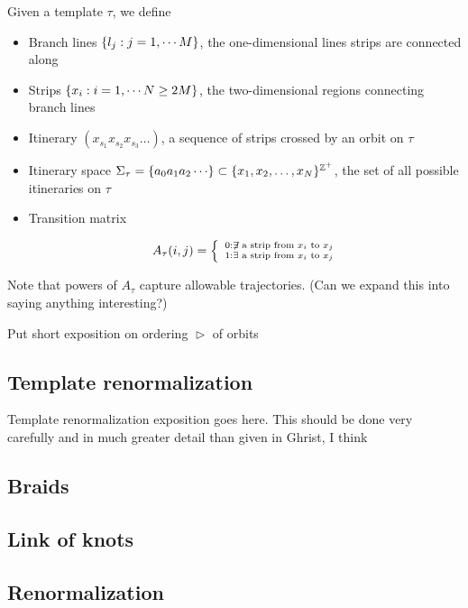 \documentclass[paper.tex]{subfiles}
\begin{document}
\begin{definition}
  Given a template $\tau$, we define
  \begin{itemize}
    \item Branch lines  $\{ l_j : j = 1, \cdots M \}$, the one-dimensional lines strips are connected along
    \item Strips $\{ x_i : i = 1, \cdots N \geq 2 M \}$, the two-dimensional regions connecting branch lines
    \item Itinerary $(x_{s_1}x_{s_2}x_{s_3} \dots)$, a sequence of strips crossed by an orbit on $\tau$
    \item Itinerary space $\Sigma_\tau = \set{a_0 a_1 a_2 \cdots} \subset \set{x_1, x_2, \ldots, x_N}^{\Z^+}$, the set of all possible itineraries on $\tau$
    \item Transition matrix

      \begin{equation}
        A_\tau(i,j) = \left\{ \
        \begin{smallmatrix}
          0: \not\exists \text{ a strip from } x_i \text{ to } x_j \\
          1: \exists \text{ a strip from } x_i \text{ to } x_j
        \end{smallmatrix}
        \right.
      \end{equation}
  \end{itemize}
\end{definition}

Note that powers of $A_\tau$ capture allowable trajectories. (Can we expand this into saying anything interesting?)

Put short exposition on ordering $\vartriangleright$ of orbits


\subsection{Template renormalization}
Template renormalization exposition goes here. This should be done very carefully and in much greater detail than given in Ghrist, I think

\subsection{Braids}

\subsection{Link of knots}

\subsection{Renormalization}
\end{document}

